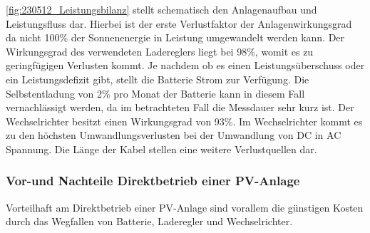 \autoref{fig:230512_Leistungsbilanz} stellt schematisch den Anlagenaufbau und Leistungsfluss dar. Hierbei ist der erste Verlustfaktor der Anlagenwirkungsgrad da nicht 100\% der Sonnenenergie in Leistung umgewandelt werden kann. Der Wirkungsgrad des verwendeten Ladereglers liegt bei 98\%, womit es zu geringfügigen Verlusten kommt. Je nachdem ob es einen Leistungsüberschuss oder ein Leistungsdefizit gibt, stellt die Batterie Strom zur Verfügung. Die Selbstentladung von 2\% pro Monat der Batterie kann in diesem Fall vernachlässigt werden, da im betrachteten Fall die Messdauer sehr kurz ist. Der Wechselrichter besitzt einen Wirkungsgrad von 93\%. Im Wechselrichter kommt es zu den höchsten Umwandlungsverlusten bei der Umwandlung von DC in AC Spannung.
Die Länge der Kabel stellen eine weitere Verlustquellen dar.


\subsubsection{Vor-und Nachteile Direktbetrieb einer PV-Anlage}
Vorteilhaft am Direktbetrieb einer PV-Anlage sind vorallem die günstigen Kosten durch das Wegfallen von Batterie, Laderegler und Wechselrichter.


